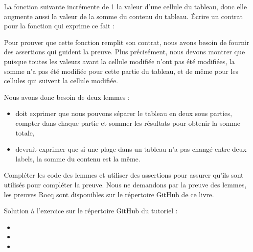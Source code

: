 \label{l4:proof-methodologies-triggering-lemmas-exercises-sum}


La fonction suivante incrémente de 1 la valeur d'une cellule du tableau, donc
elle augmente aussi la valeur de la somme du contenu du tableau. Écrire un contrat
pour la fonction qui exprime ce fait :




Pour prouver que cette fonction remplit son contrat, nous avons besoin de fournir
des assertions qui guident la preuve. Plus précisément, nous devons montrer que
puisque toutes les valeurs avant la cellule modifiée n'ont pas été modifiées, la
somme n'a pas été modifiée pour cette partie du tableau, et de même pour les
cellules qui suivent la cellule modifiée.


Nous avons donc besoin de deux lemmes :
\begin{itemize}
    \item {} doit exprimer que nous pouvons séparer le
          tableau en deux sous parties, compter dans chaque partie et sommer les
          résultats pour obtenir la somme totale,
    \item {} devrait exprimer que si une plage dans un
          tableau n'a pas changé entre deux labels, la somme du contenu est la
          même.
\end{itemize}


Compléter les code des lemmes et utiliser des assertions pour assurer qu'ils sont
utilisés pour compléter la preuve. Nous ne demandons par la preuve des lemmes, les
preuves Rocq sont disponibles sur le répertoire GitHub de ce livre.


\begin{Information}
  Solution à l'exercice sur le répertoire GitHub du tutoriel :
  \begin{itemize}
    \item {}
    \item {}
    \item {}
  \end{itemize}
\end{Information}
